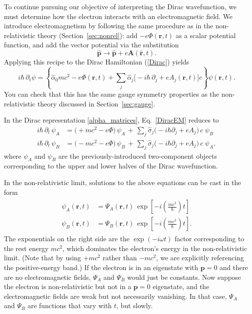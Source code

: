\documentclass[pra,12pt]{revtex4}
\begin{document}
To continue pursuing our objective of interpreting the Dirac
wavefunction, we must determine how the electron interacts with an
electromagnetic field.  We introduce electromagnetism by following the
same procedure as in the non-relativistic theory
(Section~\ref{sec:nonrel}): add $-e\Phi(\mathbf{r},t)$ as a scalar
potential function, and add the vector potential via the substitution
\begin{equation}
  \hat{\mathbf{p}} \rightarrow \hat{\mathbf{p}}
  + e\mathbf{A}(\hat{\mathbf{r}},t).  
\end{equation}
Applying this recipe to the Dirac Hamiltonian (\ref{Dirac}) yields
\begin{equation}
  i\hbar \, \partial_t \psi
  = \left\{\hat{\alpha}_0 mc^2 -e\Phi(\mathbf{r},t)
  + \sum_{j} \hat{\alpha}_j \Big[-i\hbar\,\partial_j
    +eA_j(\mathbf{r},t) \Big] c\right\}\psi(\mathbf{r},t).
  \label{DiracEM}
\end{equation}
You can check that this has the same gauge symmetry properties as the
non-relativistic theory discussed in Section~\ref{sec:gauge}.

In the Dirac representation \eqref{alpha_matrices},
Eq.~\eqref{DiracEM} reduces to
\begin{align}
  i\hbar\, \partial_t \, \psi_A
  &= \big(+mc^2 -e\Phi \big)\,
  \psi_A
  \,+\, \sum_{j} \hat{\sigma}_j \big(-i\hbar\partial_j
    +eA_j \big) \,c\;\psi_B \label{Dirac2a} \\
  i\hbar\, \partial_t \, \psi_B
  &= \big(- mc^2 -e\Phi\big)\,
  \psi_B \,+\, \sum_{j} \hat{\sigma}_j \big(-i\hbar\partial_j
    +eA_j \big)\, c\;\psi_A, \label{Dirac2b}
\end{align}
where $\psi_A$ and $\psi_B$ are the previously-introduced
two-component objects corresponding to the upper and lower halves of
the Dirac wavefunction.

In the non-relativistic limit, solutions to the above equations can be
cast in the form
\begin{align}
  \begin{aligned}
  \psi_{A}(\mathbf{r},t) &= \Psi_{A}(\mathbf{r},t)\,
  \exp\left[-i\left(\frac{mc^2}{\hbar}\right)t\right] \\
  \psi_{B}(\mathbf{r},t) &= \Psi_{B}(\mathbf{r},t)\,
  \exp\left[-i\left(\frac{mc^2}{\hbar}\right)t\right].
  \end{aligned}
\end{align}
The exponentials on the right side are the $\exp(-i\omega t)$ factor
corresponding to the rest energy $mc^2$, which dominates the
electron's energy in the non-relativistic limit.  (Note that by using
$+mc^2$ rather than $-mc^2$, we are explicitly referencing the
positive-energy band.)  If the electron is in an eigenstate with
$\mathbf{p} = 0$ and there are no electromagnetic fields, $\Psi_A$ and
$\Psi_B$ would just be constants.  Now suppose the electron is
non-relativistic but not in a $\mathbf{p} = 0$ eigenstate, and the
electromagnetic fields are weak but not necessarily vanishing.  In
that case, $\Psi_A$ and $\Psi_B$ are functions that vary with $t$, but
slowly.
\end{document}

